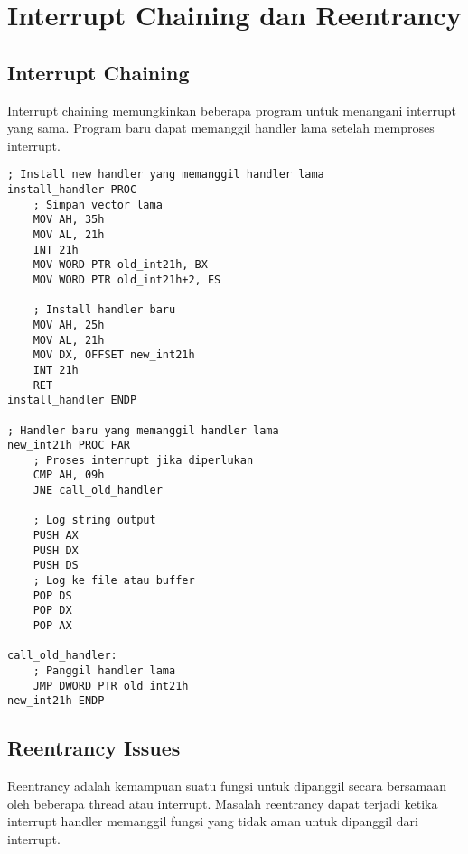 \documentclass[../main.tex]{subfiles}
\begin{document}
    \section{Interrupt Chaining dan Reentrancy}
        \subsection{Interrupt Chaining}
            Interrupt chaining memungkinkan beberapa program untuk menangani interrupt yang sama. Program baru dapat memanggil handler lama setelah memproses interrupt.

            \begin{lstlisting}[language={[x86masm]Assembler}, caption=Contoh Interrupt Chaining, label={lst:interrupt-chaining}]
; Install new handler yang memanggil handler lama
install_handler PROC
    ; Simpan vector lama
    MOV AH, 35h
    MOV AL, 21h
    INT 21h
    MOV WORD PTR old_int21h, BX
    MOV WORD PTR old_int21h+2, ES
    
    ; Install handler baru
    MOV AH, 25h
    MOV AL, 21h
    MOV DX, OFFSET new_int21h
    INT 21h
    RET
install_handler ENDP

; Handler baru yang memanggil handler lama
new_int21h PROC FAR
    ; Proses interrupt jika diperlukan
    CMP AH, 09h
    JNE call_old_handler
    
    ; Log string output
    PUSH AX
    PUSH DX
    PUSH DS
    ; Log ke file atau buffer
    POP DS
    POP DX
    POP AX
    
call_old_handler:
    ; Panggil handler lama
    JMP DWORD PTR old_int21h
new_int21h ENDP
            \end{lstlisting}

        \subsection{Reentrancy Issues}
            Reentrancy adalah kemampuan suatu fungsi untuk dipanggil secara bersamaan oleh beberapa thread atau interrupt. Masalah reentrancy dapat terjadi ketika interrupt handler memanggil fungsi yang tidak aman untuk dipanggil dari interrupt.
\end{document}
